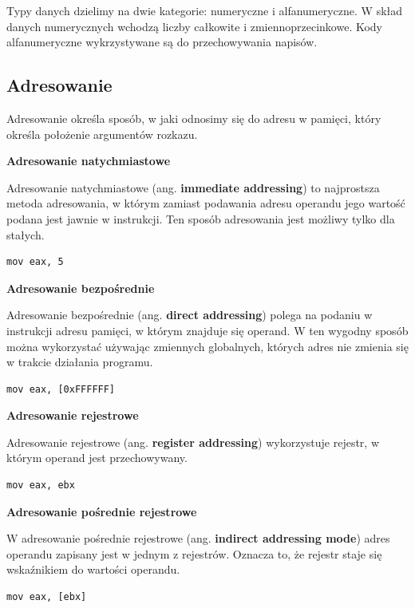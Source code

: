 \documentclass[a4paper,12pt]{article}
\begin{document}
Typy danych dzielimy na dwie kategorie: numeryczne i alfanumeryczne. W skład danych numerycznych wchodzą liczby całkowite i zmiennoprzecinkowe. Kody alfanumeryczne wykrzystywane są do przechowywania napisów.

\subsection{Adresowanie}

Adresowanie określa sposób, w jaki odnosimy się do adresu w pamięci, który określa położenie argumentów rozkazu.

\textbf{Adresowanie natychmiastowe}

Adresowanie natychmiastowe (ang. \textbf{immediate addressing}) to najprostsza metoda adresowania, w którym zamiast podawania adresu operandu jego wartość podana jest jawnie w instrukcji. Ten sposób adresowania jest możliwy tylko dla stałych.

\begin{lstlisting}
mov eax, 5
\end{lstlisting}

\textbf{Adresowanie bezpośrednie}

Adresowanie bezpośrednie (ang. \textbf{direct addressing}) polega na podaniu w instrukcji adresu pamięci, w którym znajduje się operand. W ten wygodny sposób można wykorzystać używając zmiennych globalnych, których adres nie zmienia się w trakcie działania programu.

\begin{lstlisting}
mov eax, [0xFFFFFF]
\end{lstlisting}

\textbf{Adresowanie rejestrowe}

Adresowanie rejestrowe (ang. \textbf{register addressing}) wykorzystuje rejestr, w którym operand jest przechowywany.

\begin{lstlisting}
mov eax, ebx
\end{lstlisting}

\textbf{Adresowanie pośrednie rejestrowe}

W adresowanie pośrednie rejestrowe (ang. \textbf{indirect addressing mode}) adres operandu zapisany jest w jednym z rejestrów. Oznacza to, że rejestr staje się wskaźnikiem do wartości operandu.

\begin{lstlisting}
mov eax, [ebx]
\end{lstlisting}
\end{document}
